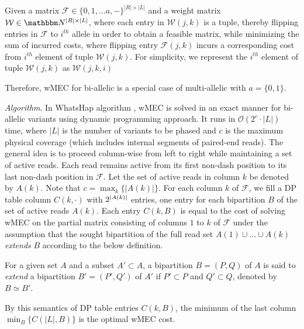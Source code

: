 \begin{problem}
Given a matrix $\mathcal{F}\in\{0,1, \ldots a, -\}^{|R|\times |L|}$ and a weight matrix $\mathcal{W}\in\N^{|R|\times |L|}$, where each entry in $\mathcal{W}(j,k)$ is a tuple, thereby flipping entries in $\mathcal{F}$ to $i^{th}$ allele in order to obtain a feasible matrix, while minimizing the sum of incurred costs, where flipping entry $\mathcal{F}(j,k)$ incurs a corresponding cost from $i^{th}$ element of tuple $\mathcal{W}(j,k)$.
For simplicity, we represent the $i^{th}$ element of tuple $\mathcal{W}(j,k)$ as $\mathcal{W}(j,k,i)$
\end{problem}

Therefore, wMEC for bi-allelic is a special case of multi-allelic with $a=\{0,1\}$.

\textit{Algorithm}. In WhatsHap algorithm \citep{ ...}, wMEC is solved in an exact manner for bi-allelic variants using dynamic programming approach.
It runs in $\mathcal{O}(2^c\cdot |L|)$ time, where $|L|$ is the number of variants to be phased and $c$ is the maximum physical coverage (which includes internal segments of paired-end reads).
The general idea is to proceed column-wise from left to right while maintaining a set of active reads.
Each read remains active from its first non-dash position to its last non-dash position in $\mathcal{F}$.
Let the set of active reads in column $k$ be denoted by $A(k)$.
Note that $c=\max_{k}\{|A(k)|\}$.
For each column $k$ of $\mathcal{F}$, we fill a DP table column $C(k,\cdot)$ with $2^{\left\lvert A(k) \right\rvert}$ entries, one entry for each bipartition $B$ of the set of active reads $A(k)$.
Each entry $C(k,B)$ is equal to the cost of solving wMEC on the partial matrix consisting of columns $1$ to $k$ of $\mathcal{F}$ under the assumption that the sought bipartition of the full read set $A(1)\cup\ldots\cup A(k)$ \emph{extends} $B$ according to the below definition.
\begin{definition}
For a given set $A$ and a subset $A'\subset A$, a bipartition $B=(P,Q)$ of $A$ is said to \emph{extend} a bipartition $B'=(P',Q')$ of $A'$ if $P'\subset P$ and $Q'\subset Q$, denoted by $B\simeq B'$.
\end{definition}
By this semantics of DP table entries $C(k,B)$, the minimum of the last column $\min_B\{C(|L|,B)\}$ is the optimal wMEC cost.

